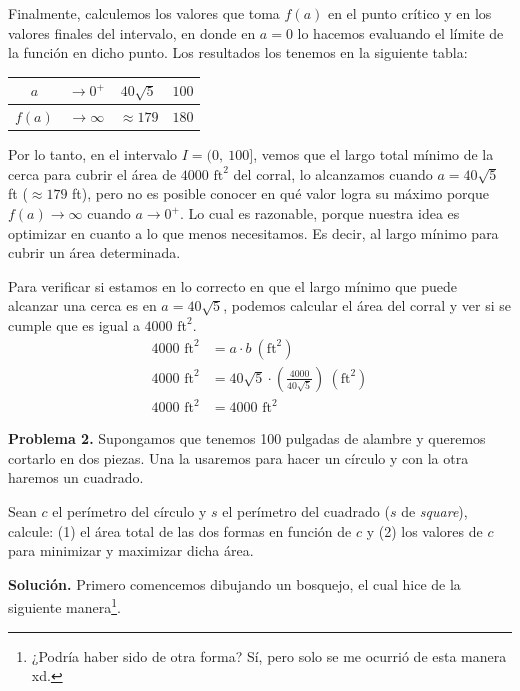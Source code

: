 \documentclass[12pt]{article}
\begin{document}
Finalmente, calculemos los valores que toma $f(a)$ en el punto crítico y en los valores finales del intervalo, en donde en $a = 0$ lo hacemos evaluando el límite de la función en dicho punto. Los resultados los tenemos en la siguiente tabla:

\begin{table}[hbt!]
\centering

\begin{tabular}{c | c c c}
$a$ & $\to 0^{+}$ & $40 \sqrt{5}$ & $100$ \\
\hline
$f(a)$ & $\to \infty$ & $\approx 179$ & $180$
\end{tabular}

\end{table}

Por lo tanto, en el intervalo $I = (0, \ 100]$, vemos que el largo total mínimo de la cerca para cubrir el área de $4000 \text{ ft}^{2}$ del corral, lo alcanzamos cuando $a = 40\sqrt{5}$ ft ($\approx 179$ ft), pero no es posible conocer en qué valor logra su máximo porque $f(a) \to \infty$ cuando $a \to 0^{+}$. Lo cual es razonable, porque nuestra idea es optimizar en cuanto a lo que menos necesitamos. Es decir, al largo mínimo para cubrir un área determinada.

Para verificar si estamos en lo correcto en que el largo mínimo que puede alcanzar una cerca es en $a = 40\sqrt{5}$, podemos calcular el área del corral y ver si se cumple que es igual a $4000 \text{ ft}^{2}$.
\begin{align*}
4000 \text{ ft}^{2} &= a \cdot b \ (\text{ft}^{2}) \\
4000 \text{ ft}^{2} &=
	40\sqrt{5} \cdot \left(\frac{4000}{40\sqrt{5}}\right) \
	(\text{ft}^{2}) \\
4000 \text{ ft}^{2} &= 4000 \text{ ft}^{2}
\end{align*}

\newpage

\textbf{Problema 2.} \quad Supongamos que tenemos 100 pulgadas de alambre y queremos cortarlo en dos piezas. Una la usaremos para hacer un círculo y con la otra haremos un cuadrado.

Sean $c$ el perímetro del círculo y $s$ el perímetro del cuadrado ($s$ de \textit{square}), calcule: (1) el área total de las dos formas en función de $c$ y (2) los valores de $c$ para minimizar y maximizar dicha área.

\textbf{Solución.} \quad Primero comencemos dibujando un bosquejo, el cual hice de la siguiente manera\footnote{¿Podría haber sido de otra forma? Sí, pero solo se me ocurrió de esta manera xd.}.
\end{document}

